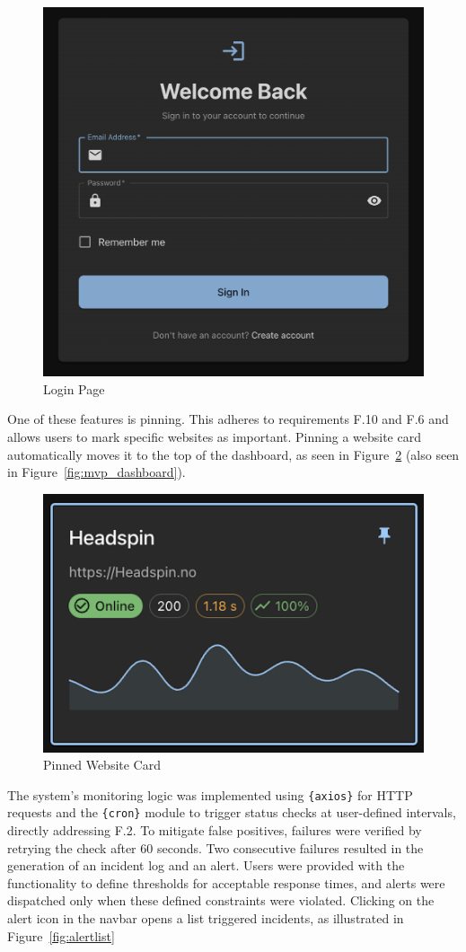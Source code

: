 \begin{figure}
    \centering
    \includegraphics[width=0.75\linewidth]{figures/final_application/final_loginpage.png}
    \caption{Login Page}
    \label{fig:login_page}
\end{figure}


One of these features is pinning. This adheres to requirements F.10 and F.6 and allows users to mark specific websites as important. Pinning a website card automatically moves it to the top of the dashboard, as seen in Figure~\ref{fig:mvp_pinned_card} (also seen in Figure~\ref{fig:mvp_dashboard}).

\begin{figure}
    \centering
    \includegraphics[width=0.5\linewidth]{figures/MVP-dashboard/MVP-pinned-card.png}
    \caption{Pinned Website Card}
    \label{fig:mvp_pinned_card}
\end{figure}


The system's monitoring logic was implemented using \texttt\gls{{axios}} for HTTP requests and the \texttt\gls{{cron}} module to trigger status checks at user-defined intervals, directly addressing F.2. To mitigate false positives, failures were verified by retrying the check after 60 seconds. Two consecutive failures resulted in the generation of an incident log and an alert. Users were provided with the functionality to define thresholds for acceptable response times, and alerts were dispatched only when these defined constraints were violated. Clicking on the alert icon in the navbar opens a list triggered incidents, as illustrated in Figure~\ref{fig:alertlist}

